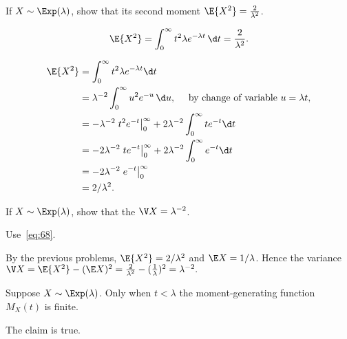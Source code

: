 \begin{extra} 
 If $X\sim\Exp(\lambda)$, show that its second moment $\E{X^2} = \frac{2}{\lambda^2}$.
\begin{hint}
 \begin{equation*}
 \E{X^2}= \int_0^\infty t^2 \lambda e^{-\lambda t}\, \d t = \frac{2}{\lambda^2}.
 \end{equation*}
\end{hint}
\begin{solution}
 \begin{align*}
\E{X^2} 
&= \int_0^\infty t^2 \lambda e^{-\lambda t} \d t \\
&= \lambda^{-2} \int_0^\infty u^2 e^{-u}\, \d u, \quad \text{ by change of variable $u=\lambda t$}, \\
&= -\lambda^{-2}\left. t^2 e^{- t}\right|_0^\infty + 2\lambda^{-2}\int_0^\infty t e^{- t} \d t \\
&= -2\lambda^{-2}\left. t e^{- t}\right|_0^\infty + 2\lambda^{-2} \int_0^\infty e^{- t} \d t\\
&= - 2\lambda^{-2} \left. e^{- t} \right|_0^\infty \\
&= 2/\lambda^2.
 \end{align*}
\end{solution}
\end{extra}


\begin{extra}
 If $X\sim\Exp(\lambda)$, show that the 
$\V X = \lambda^{-2}$.
\begin{hint} Use~\cref{eq:68}. 
\end{hint}
\begin{solution}
 By the previous problems, $\E{X^2}=2/\lambda^2$ and $\E X = 1/\lambda$. Hence the variance $\V X = \E{X^2} - (\E X)^2 = \frac{2}{\lambda^2} - (\frac{1}{\lambda})^2 = \lambda^{-2}.$
\end{solution}
\end{extra}


\begin{extra}
 Suppose $X\sim\Exp(\lambda)$.
 Only when $t < \lambda$ the moment-generating function $M_X(t)$ is finite.
\begin{solution} The claim is true. 
\end{solution}
\end{extra}

